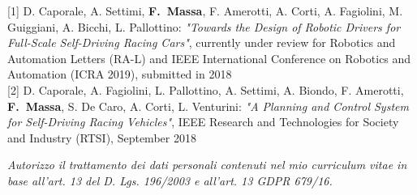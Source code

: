 \documentclass[a4paper,12pt]{article} %
\begin{document}


\small{
[1] \hspace{2pt} D. Caporale, A. Settimi, \mbox{\textbf{F. Massa}}, F. Amerotti, A. Corti, A. Fagiolini, M. Guiggiani, A. Bicchi, L. Pallottino: \textit{"Towards the Design of Robotic Drivers for Full-Scale Self-Driving Racing Cars"}, currently under review for Robotics and Automation Letters (RA-L) and IEEE International Conference on Robotics and Automation (ICRA 2019), submitted in 2018 \\

[2] \hspace{2pt} D. Caporale, A. Fagiolini, L. Pallottino, A. Settimi, A. Biondo, F. Amerotti, \mbox{\textbf{F. Massa}}, S. De Caro, A. Corti, L. Venturini: \textit{"A Planning and Control System for Self-Driving Racing Vehicles"}, IEEE Research and Technologies for Society and Industry (RTSI), September 2018
}

\Sep 








\Sep %

%
%
\vspace{8 cm}
\textit{Autorizzo il trattamento dei dati personali contenuti nel mio curriculum vitae in base all’art. 13 del D. Lgs. 196/2003 e all’art. 13 GDPR 679/16.}\\
\end{document}
